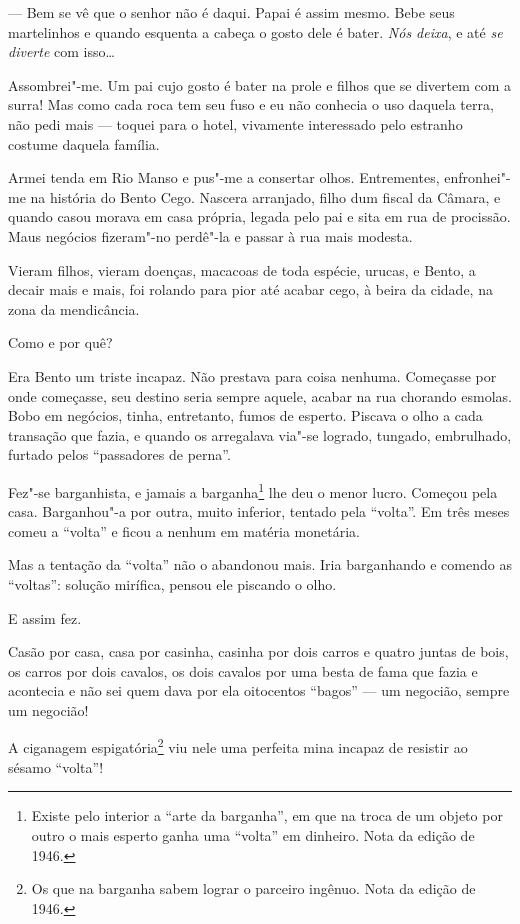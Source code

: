 --- Bem se vê que o senhor não é daqui. Papai é assim mesmo. Bebe seus
martelinhos e quando esquenta a cabeça o gosto dele é bater. \emph{Nós
deixa}, e até \emph{se diverte} com isso\ldots{}

Assombrei"-me. Um pai cujo gosto é bater na prole e filhos que se
divertem com a surra! Mas como cada roca tem seu fuso e eu não conhecia
o uso daquela terra, não pedi mais --- toquei para o hotel, vivamente
interessado pelo estranho costume daquela família.

Armei tenda em Rio Manso e pus"-me a consertar olhos. Entrementes,
enfronhei"-me na história do Bento Cego. Nascera arranjado, filho dum
fiscal da Câmara, e quando casou morava em casa própria, legada pelo pai
e sita em rua de procissão. Maus negócios fizeram"-no perdê"-la e passar à
rua mais modesta.

Vieram filhos, vieram doenças, macacoas de toda espécie, urucas, e
Bento, a decair mais e mais, foi rolando para pior até acabar cego, à
beira da cidade, na zona da mendicância.

Como e por quê?

Era Bento um triste incapaz. Não prestava para coisa nenhuma. Começasse
por onde começasse, seu destino seria sempre aquele, acabar na rua
chorando esmolas. Bobo em negócios, tinha, entretanto, fumos de esperto.
Piscava o olho a cada transação que fazia, e quando os arregalava via"-se
logrado, tungado, embrulhado, furtado pelos ``passadores de perna''.

Fez"-se barganhista, e jamais a barganha\footnote{Existe pelo interior a
  ``arte da barganha'', em que na troca de um objeto por outro o mais
  esperto ganha uma ``volta'' em dinheiro. Nota da edição de 1946.} lhe
deu o menor lucro. Começou pela casa. Barganhou"-a por outra, muito
inferior, tentado pela ``volta''. Em três meses comeu a ``volta'' e
ficou a nenhum em matéria monetária.

Mas a tentação da ``volta'' não o abandonou mais. Iria barganhando e
comendo as ``voltas'': solução mirífica, pensou ele piscando o olho.

E assim fez.

Casão por casa, casa por casinha, casinha por dois carros e quatro
juntas de bois, os carros por dois cavalos, os dois cavalos por uma
besta de fama que fazia e acontecia e não sei quem dava por ela
oitocentos ``bagos'' --- um negocião, sempre um negocião!

A ciganagem espigatória\footnote{Os que na barganha sabem lograr o
  parceiro ingênuo. Nota da edição de 1946.} viu nele uma perfeita mina
incapaz de resistir ao sésamo ``volta''!

